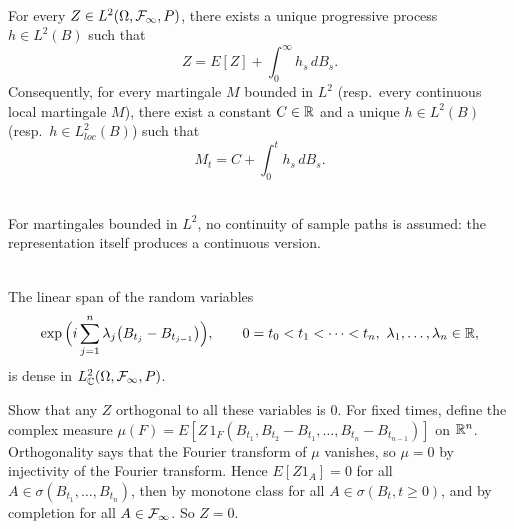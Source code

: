 \begin{theorem}\label{chap5.4:theorem-martingale_representation}
\\
For every $Z\in L^2(\Omega,\mathcal{F}_\infty,P)$, there exists a unique progressive process $h\in L^2(B)$ such that
$$Z=E[Z]+\int_0^\infty h_s\,dB_s.$$
Consequently, for every martingale $M$ bounded in $L^2$ (resp.\ every continuous local martingale $M$), there exist a constant $C\in\mathbb{R}$ and a unique $h\in L^2(B)$ (resp.\ $h\in L^2_{loc}(B)$) such that
$$M_t=C+\int_0^th_s\,dB_s.$$
\end{theorem}

\begin{remark}
\\
For martingales bounded in $L^2$, no continuity of sample paths is assumed: the representation itself produces a continuous version.
\end{remark}

\begin{lemma}\label{chap5.4:lemma-dense_exponentials}
\\
The linear span of the random variables
$$\exp\Big(i\sum_{j=1}^n\lambda_j\big(B_{t_j}-B_{t_{j-1}}\big)\Big),\qquad 0=t_0<t_1<\dots<t_n,\ \lambda_1,\dots,\lambda_n\in\mathbb{R},$$
is dense in $L^2_{\mathbb{C}}(\Omega,\mathcal{F}_\infty,P)$.
\end{lemma}

\begin{proofidea}
Show that any $Z$ orthogonal to all these variables is $0$. For fixed times, define the complex measure $\mu(F)=E[Z\,1_F(B_{t_1},B_{t_2}-B_{t_1},\dots,B_{t_n}-B_{t_{n-1}})]$ on $\mathbb{R}^n$. Orthogonality says that the Fourier transform of $\mu$ vanishes, so $\mu=0$ by injectivity of the Fourier transform. Hence $E[Z1_A]=0$ for all $A\in\sigma(B_{t_1},\dots,B_{t_n})$, then by monotone class for all $A\in\sigma(B_t,t\geq0)$, and by completion for all $A\in\mathcal{F}_\infty$. So $Z=0$.
\end{proofidea}

